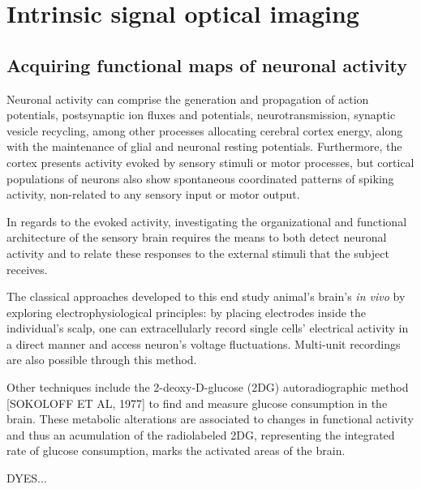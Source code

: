 \section{Intrinsic signal optical imaging}
\label{sec:sectiona}

\subsection{Acquiring functional maps of neuronal activity}

Neuronal activity can comprise the generation and propagation of action potentials, postsynaptic ion fluxes and potentials, neurotransmission, synaptic vesicle recycling, among other processes allocating cerebral cortex energy, along with the maintenance of glial and neuronal resting potentials. Furthermore, the cortex presents activity evoked by sensory stimuli or motor processes, but cortical populations of neurons also show spontaneous coordinated patterns of spiking activity, non-related to any sensory input or motor output.

In regards to the evoked activity, investigating the organizational and functional architecture of the sensory brain requires the means to both detect neuronal activity and to relate these responses to the external stimuli that the subject receives.  

 

The classical approaches developed to this end study animal's brain's \textit{in vivo} by exploring electrophysiological principles: by placing electrodes inside the individual's scalp, one can extracellularly record single cells' electrical activity in a direct manner and access neuron's voltage fluctuations. Multi-unit recordings are also possible through this method. 

Other techniques include the 2-deoxy-D-glucose (2DG) autoradiographic method [SOKOLOFF ET AL, 1977] to find and measure glucose consumption in the brain. These metabolic alterations are associated to changes in functional activity and thus an acumulation of the radiolabeled 2DG, representing the integrated rate of glucose consumption, marks the activated areas of the brain.

DYES...

